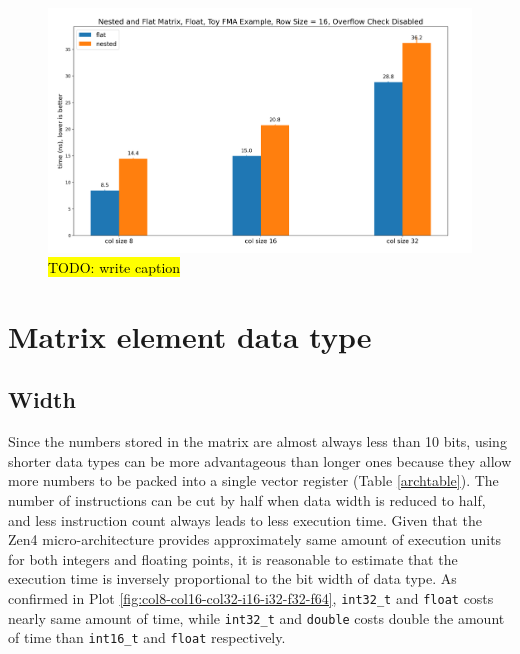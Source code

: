 \documentclass[logo,bsc,singlespacing,parskip]{infthesis}
\begin{document}
\begin{figure}
    \includegraphics[width=\linewidth]{image/nested-flat.jpg}
    \caption{\hl{TODO: write caption}}
    \label{fig:nested-flat}
\end{figure}


\section{Matrix element data type}


\subsection{Width}
Since the numbers stored in the matrix are almost always less than 10 bits,
using shorter data types can be more advantageous than longer ones because they
allow more numbers to be packed into a single vector register (Table
\ref{archtable}). The number of instructions can be cut by half when data width
is reduced to half, and less instruction count always leads to less execution
time. Given that the Zen4 micro-architecture provides approximately same amount
of execution units for both integers and floating points, it is reasonable to
estimate that the execution time is inversely proportional to the bit width of
data type. As confirmed in Plot \ref{fig:col8-col16-col32-i16-i32-f32-f64},
\texttt{int32\_t} and \texttt{float} costs nearly same amount of time, while
\texttt{int32\_t} and \texttt{double} costs double the amount of time than
\texttt{int16\_t} and \texttt{float} respectively.
\end{document}
